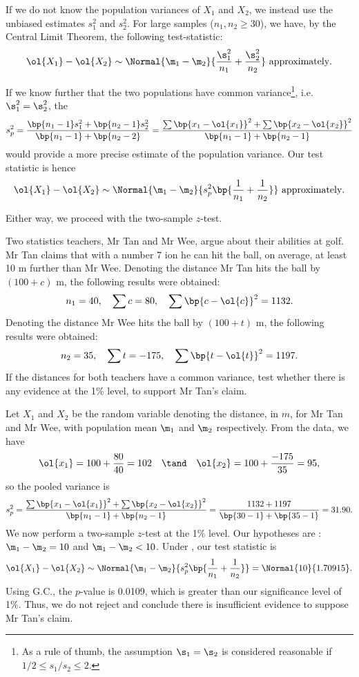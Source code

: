 If we do not know the population variances of $X_1$ and $X_2$, we instead use the unbiased estimates $s_1^2$ and $s_2^2$. For large samples ($n_1, n_2 \geq 30$), we have, by the Central Limit Theorem, the following test-statistic: \[\ol{X_1} - \ol{X_2} \sim \Normal{\m_1 - \m_2}{\frac{\s_1^2}{n_1} + \frac{\s_2^2}{n_2}} \text{ approximately}.\]

If we know further that the two populations have common variance\footnote{As a rule of thumb, the assumption $\s_1 = \s_2$ is considered reasonable if $1/2 \leq s_1/s_2 \leq 2$.}, i.e. $\s_1^2 = \s_2^2$, the  \[s_p^2 = \frac{\bp{n_1-1} s_1^2 + \bp{n_2 - 1} s_2^2}{\bp{n_1 - 1} + \bp{n_2 - 2}} = \frac{\sum \bp{x_1 - \ol{x_1}}^2 + \sum \bp{x_2 - \ol{x_2}}^2}{\bp{n_1 - 1} + \bp{n_2 - 1}}\] would provide a more precise estimate of the population variance. Our test statistic is hence \[\ol{X_1} - \ol{X_2} \sim \Normal{\m_1 - \m_2}{s_p^2 \bp{\frac{1}{n_1} + \frac{1}{n_2}}} \text{ approximately}.\]

Either way, we proceed with the two-sample $z$-test.

\begin{sample}
    Two statistics teachers, Mr Tan and Mr Wee, argue about their abilities at golf. Mr Tan claims that with a number 7 ion he can hit the ball, on average, at least 10 m further than Mr Wee. Denoting the distance Mr Tan hits the ball by $(100 + c)$ m, the following results were obtained: \[n_1 = 40, \quad \sum c = 80, \quad \sum \bp{c - \ol{c}}^2 = 1132.\] Denoting the distance Mr Wee hits the ball by $(100 + t)$ m, the following results were obtained: \[n_2 = 35, \quad \sum t = -175, \quad \sum \bp{t - \ol{t}}^2 = 1197.\] If the distances for both teachers have a common variance, test whether there is any evidence at the 1\% level, to support Mr Tan's claim.
\end{sample}
\begin{sampans}
    Let $X_1$ and $X_2$ be the random variable denoting the distance, in $m$, for Mr Tan and Mr Wee, with population mean $\m_1$ and $\m_2$ respectively. From the data, we have \[\ol{x_1} = 100 + \frac{80}{40} = 102 \quad \tand \quad \ol{x_2} = 100 + \frac{-175}{35} = 95,\] so the pooled variance is \[s_p^2 = \frac{\sum \bp{x_1 - \ol{x_1}}^2 + \sum \bp{x_2 - \ol{x_2}}^2}{\bp{n_1 - 1} + \bp{n_2 - 1}} = \frac{1132 + 1197}{\bp{30 - 1} + \bp{35 - 1}} = 31.90.\] We now perform a two-sample $z$-test at the 1\% level. Our hypotheses are \nullhyp: $\m_1 - \m_2 = 10$ and $\m_1 - \m_2 < 10$. Under \nullhyp, our test statistic is \[\ol{X_1} - \ol{X_2} \sim \Normal{\m_1 - \m_2}{s_p^2 \bp{\frac1{n_1} + \frac1{n_2}}} = \Normal{10}{1.70915}.\] Using G.C., the $p$-value is 0.0109, which is greater than our significance level of 1\%. Thus, we do not reject \nullhyp{} and conclude there is insufficient evidence to suppose Mr Tan's claim.
\end{sampans}

